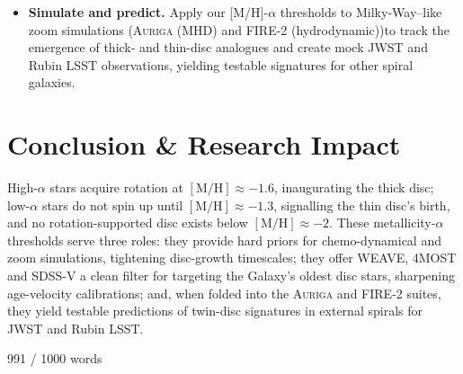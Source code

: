 \documentclass[a4paper,10pt]{article}
\begin{document}
\begin{multicols}{2}
\begin{itemize}
  \item \textbf{Simulate and predict.}  Apply our [M/H]-$\alpha$ thresholds to 
  Milky-Way–like zoom simulations (\textsc{Auriga} (MHD) and \textsc{FIRE-2} 
 (hydrodynamic))to track the emergence of thick- and thin-disc analogues 
 and create mock JWST and Rubin LSST observations, yielding testable signatures 
 for other spiral galaxies.

\end{itemize}


\section*{Conclusion \& Research Impact}

High-$\alpha$ stars acquire rotation at $\mathrm{[M/H]}\approx-1.6$, inaugurating the thick disc; 
low-$\alpha$ stars do not spin up until $\mathrm{[M/H]}\approx-1.3$, signalling the thin disc's 
birth, and no rotation-supported disc exists below $\mathrm{[M/H]}\approx-2$.  These 
metallicity-$\alpha$ thresholds serve three roles: they provide hard priors for chemo-dynamical 
and zoom simulations, tightening disc-growth timescales; they offer WEAVE, 4MOST and SDSS-V a 
clean filter for targeting the Galaxy's oldest disc stars, sharpening age-velocity calibrations; 
and, when folded into the \textsc{Auriga} and \textsc{FIRE-2} suites, they yield testable predictions 
of twin-disc signatures in external spirals for JWST and Rubin LSST.



\newpage{}

991 / 1000 words








  


\end{multicols}
\end{document}
